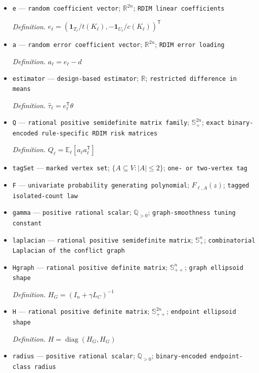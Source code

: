 \documentclass{article}
\begin{document}
\begin{itemize}
  \item \texttt{e} --- \texttt{random coefficient vector}; \(\mathbb R^{2n}\); \texttt{RDIM linear coefficients}
  \par\smallskip\noindent\emph{Definition.} \(e_{\ell}=(\mathbf 1_{T_{\ell}}/t(K_{\ell}),-\mathbf 1_{U_{\ell}}/c(K_{\ell}))^{\mathsf T}\)
  \item \texttt{a} --- \texttt{random error coefficient vector}; \(\mathbb R^{2n}\); \texttt{RDIM error loading}
  \par\smallskip\noindent\emph{Definition.} \(a_{\ell}=e_{\ell}-d\)
  \item \texttt{estimator} --- \texttt{design-\allowbreak{}based estimator}; \(\mathbb R\); \texttt{restricted difference in means}
  \par\smallskip\noindent\emph{Definition.} \(\widehat\tau_{\ell}=e_{\ell}^{\mathsf T}\theta\)
  \item \texttt{Q} --- \texttt{rational positive semidefinite matrix family}; \(\mathbb S_{+}^{2n}\); \texttt{exact binary-\allowbreak{}encoded rule-\allowbreak{}specific RDIM risk matrices}
  \par\smallskip\noindent\emph{Definition.} \(Q_{\ell}=\mathbb E_{\ell}[a_{\ell}a_{\ell}^{\mathsf T}]\)
  \item \texttt{tagSet} --- \texttt{marked vertex set}; \(\{A\subseteq V:|A|\le 2\}\); \texttt{one-\allowbreak{} or two-\allowbreak{}vertex tag}
  \item \texttt{F} --- \texttt{univariate probability generating polynomial}; \(F_{\ell,A}(z)\); \texttt{tagged isolated-\allowbreak{}count law}
  \item \texttt{gamma} --- \texttt{positive rational scalar}; \(\mathbb Q_{>0}\); \texttt{graph-\allowbreak{}smoothness tuning constant}
  \item \texttt{laplacian} --- \texttt{rational positive semidefinite matrix}; \(\mathbb S_{+}^{n}\); \texttt{combinatorial Laplacian of the conflict graph}
  \item \texttt{Hgraph} --- \texttt{rational positive definite matrix}; \(\mathbb S_{++}^{n}\); \texttt{graph ellipsoid shape}
  \par\smallskip\noindent\emph{Definition.} \(H_G=(I_n+\gamma L_C)^{-1}\)
  \item \texttt{H} --- \texttt{rational positive definite matrix}; \(\mathbb S_{++}^{2n}\); \texttt{endpoint ellipsoid shape}
  \par\smallskip\noindent\emph{Definition.} \(H=\operatorname{diag}(H_G,H_G)\)
  \item \texttt{radius} --- \texttt{positive rational scalar}; \(\mathbb Q_{>0}\); \texttt{binary-\allowbreak{}encoded endpoint-\allowbreak{}class radius}

\end{itemize}
\end{document}
